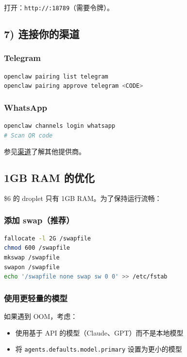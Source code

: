 打开：\texttt{http://:18789}（需要令牌）。

\subsection{7) 连接你的渠道}


\subsubsection{Telegram}


\begin{lstlisting}[language=bash]
openclaw pairing list telegram
openclaw pairing approve telegram <CODE>
\end{lstlisting}


\subsubsection{WhatsApp}


\begin{lstlisting}[language=bash]
openclaw channels login whatsapp
# Scan QR code
\end{lstlisting}


参见\href{/channels}{渠道}了解其他提供商。

\hrulefill


\subsection{1GB RAM 的优化}


\$6 的 droplet 只有 1GB RAM。为了保持运行流畅：

\subsubsection{添加 swap（推荐）}


\begin{lstlisting}[language=bash]
fallocate -l 2G /swapfile
chmod 600 /swapfile
mkswap /swapfile
swapon /swapfile
echo '/swapfile none swap sw 0 0' >> /etc/fstab
\end{lstlisting}


\subsubsection{使用更轻量的模型}


如果遇到 OOM，考虑：

\begin{itemize}
  \item 使用基于 API 的模型（Claude、GPT）而不是本地模型
  \item 将 \texttt{agents.defaults.model.primary} 设置为更小的模型
\end{itemize}


